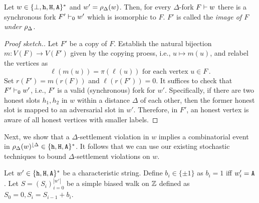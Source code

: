 \begin{proposition}\label{prop:reduction-bijection}
  Let $w \in \{\perp, \mathtt{h}, \mathtt{H}, \mathtt{A}\}^*$ 
  and $w' = \rho_\Delta(w)$. 
  Then, for every $\Delta$-fork $F \vdash w$ there is 
  a synchronous fork $F' \vdash_0 w'$ 
  which is isomorphic to $F$. 
  $F'$ is called the \emph{image of $F$ under $\rho_\Delta$}.
\end{proposition}
\begin{proof}[Proof sketch.]
  Let $F'$ be a copy of $F$. 
  Establish the natural bijection $m: V(F) \rightarrow V(F')$ 
  given by the copying proess, 
  i.e., $u \mapsto m(u)$, and 
  relabel the vertices as 
  \begin{equation}\label{eq:pi-reduction}
    \text{$\ell(m(u)) = \pi(\ell(u))$ for each vertex $u \in F$}
    \,.
  \end{equation}
  Set $r(F') = m(r(F))$ and $\ell(r(F')) = 0$.
  It suffices to check that $F' \vdash_0 w'$, 
  i.e., $F'$ is a valid (synchronous) fork for $w'$. 
  Specifically, 
  if there are two honest slots $h_1, h_2$ in $w$ 
  within a distance $\Delta$ of each other, 
  then the former honest slot is mapped to 
  an adversarial slot in $w'$. 
  Therefore, in $F'$, 
  an honest vertex is aware of 
  all honest vertices with smaller labels.
% 
\end{proof}


Next, we show that 
a $\Delta$-settlement violation in $w$ implies 
a combinatorial event in $\rho_\Delta(w)^{\lfloor {\Delta}} \in \{\mathtt{h}, \mathtt{H}, \mathtt{A}\}^*$. 
It follows that we can use our existing stochastic techniques 
to bound $\Delta$-settlement violations on $w$. 

Let $w' \in \{\mathtt{h}, \mathtt{H}, \mathtt{A}\}^*$ be a characteristic string. 
Define $b_i \in \{\pm 1\}$ as $b_i = 1$ iff $w'_i = \mathtt{A}$. 
Let $S = (S_i)_{i =0}^{|w'|}$ be a simple biased walk on $\mathbb{Z}$ 
defined as $S_0 = 0, S_i = S_{i-1} + b_i$.



